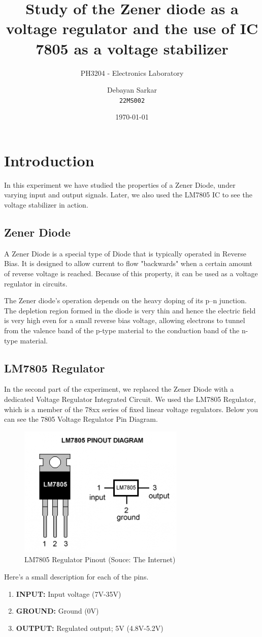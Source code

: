 \documentclass[10pt]{scrartcl}
\title{Study of the Zener diode as a voltage regulator and the use of IC 7805 as a voltage stabilizer}
\subtitle{PH3204 - Electronics Laboratory}
\author{Debayan Sarkar \\ \texttt{22MS002}}
\date{\today}
\theoremstyle{definition}
\begin{document}
\maketitle
\section{Introduction}
In this experiment we have studied the properties of a Zener Diode, under varying input and output signals.
Later, we also used the LM7805 IC to see the voltage stabilizer in action.
\subsection{Zener Diode}
A Zener Diode is a special type of Diode that is typically operated in Reverse Bias. It is designed
to allow current to flow "backwards" when a certain amount of reverse voltage is reached. Because of
this property, it can be used as a voltage regulator in circuits.

The Zener diode's operation depends on the heavy doping of its p–n junction. 
The depletion region formed in the diode is very thin and hence the electric field is 
very high even for a small reverse bias voltage, allowing electrons to 
tunnel from the valence band of the p-type material to the conduction band of the n-type 
material.
\subsection{LM7805 Regulator}
In the second part of the experiment, we replaced the Zener Diode with a dedicated Voltage Regulator
Integrated Circuit. We used the LM7805 Regulator, which is a member of the 78xx series of fixed
linear voltage regulators. Below you can see the 7805 Voltage Regulator Pin Diagram.

\begin{figure}[!h]
    \centering
    \includegraphics[width=0.3\linewidth]{IC.png}
    \caption{LM7805 Regulator Pinout (Souce: The Internet)}
\end{figure}

Here's a small description for each of the pins.
\begin{enumerate}
    \item \textbf{INPUT: }Input voltage (7V-35V)
    \item \textbf{GROUND: }Ground (0V)
    \item \textbf{OUTPUT: }Regulated output; 5V (4.8V-5.2V)
    
\end{enumerate}
\clearpage
\end{document}
